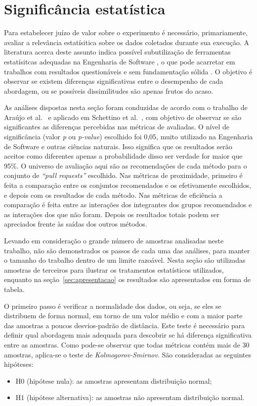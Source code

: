 \documentclass[12pt,openany,oneside,a4paper,english,brazil]{abntbibufjf}
\begin{document}
    \section{Significância estatística}\label{sec:significancia}

    Para estabelecer juízo de valor sobre o experimento é necessário, primariamente, avaliar a relevância estatísitica sobre os dados coletados durante sua execução. A literatura acerca deste assunto indica possível subutilização de ferramentas estatísitcas adequadas na Engenharia de Software \cite{miller1997}, o que pode acarretar em trabalhos com resultados questionáveis e sem fundamentação sólida \cite{dybaa2006}. O objetivo é observar se existem diferenças significativas entre o desempenho de cada abordagem, ou se possíveis dissimilitudes são apenas frutos do acaso.

    As análises dispostas nesta seção foram conduzidas de acordo com o trabalho de Araújo et al.~\cite{araujo2006} e aplicado em Schettino et al.~\cite{schettino2014}, com objetivo de observar se são significantes as diferenças percebidas nas métricas de avaliadas. O nível de significância (valor \textit{p} ou \textit{p-value}) escolhido foi 0,05, muito utilizado na Engenharia de Software e outras ciências naturais. Isso significa que os resultados serão aceitos como diferentes apenas a probabilidade disso ser verdade for maior que 95\%. O universo de avaliação aqui são as recomendações de cada método para o conjunto de  \textit{``pull requests''} escolhido. Nas métricas de proximidade, primeiro é feita a comparação entre os conjuntos recomendados e os efetivamente escolhidos, e depois com os resultados de cada método. Nas métricas de eficiência a comparação é feita entre as interações dos integrantes dos grupos recomendados e as interações dos que não foram. Depois os resultados totais podem ser apreciados frente às saídas dos outros métodos.

    Levando em consideração o grande número de amostras analisadas neste trabalho, não são demonstrados os passos de cada uma das análises, para manter o tamanho do trabalho dentro de um limite razoável. Nesta seção são utilizadas amostras de terceiros para ilustrar os tratamentos estatísticos utilizados, enquanto na seção~\ref{sec:apresentacao} os resultados são apresentados em forma de tabela.

    O primeiro passo é verificar a normalidade dos dados, ou seja, se eles se distribuem de forma normal, em torno de um valor médio e com a maior parte das amostras a poucos desvios-padrão de distância. Este teste é necessário para definir qual abordagem mais adequada para descobrir se há diferença significativa entre as amostras. Como pode-se observar que todas métricas contém mais de 30 amostras, aplica-se o teste de \textit{Kolmogorov-Smirnov}. São consideradas as seguintes hipóteses:
    \begin{itemize}
      \item H0 (hipótese nula): as amostras apresentam distribuição normal;
      \item H1 (hipótese alternativa): as amostras não apresentam distribuição normal.
    \end{itemize}
\end{document}
